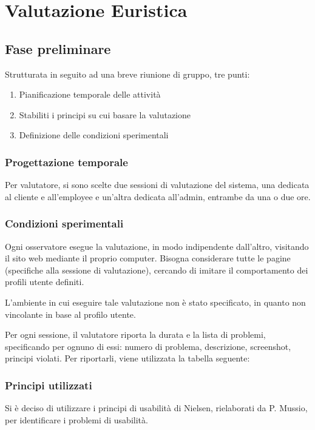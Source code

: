 \section{Valutazione Euristica}

\subsection{Fase preliminare}
Strutturata in seguito ad una breve riunione di gruppo, tre punti:
\begin{enumerate}
	\item Pianificazione temporale delle attività
	\item Stabiliti i principi su cui basare la valutazione
	\item Definizione delle condizioni sperimentali
\end{enumerate}
\subsubsection{Progettazione temporale}
Per valutatore, si sono scelte due sessioni di valutazione del sistema, una dedicata al cliente e all'employee e un'altra dedicata all'admin, entrambe da una o due ore.

\subsubsection{Condizioni sperimentali}
Ogni osservatore esegue la valutazione, in modo indipendente dall'altro, visitando il sito web mediante il proprio computer. Bisogna considerare tutte le pagine (specifiche alla sessione di valutazione), cercando di imitare il comportamento dei profili utente definiti.

L'ambiente in cui eseguire tale valutazione non è stato specificato, in quanto non vincolante in base al profilo utente.

Per ogni sessione, il valutatore riporta la durata e la lista di problemi, specificando per ognuno di essi: numero di problema, descrizione, screenshot, principi violati. Per riportarli, viene utilizzata la tabella seguente:
\\

\subsubsection{Principi utilizzati}
Si è deciso di utilizzare i principi di usabilità di Nielsen, rielaborati da P. Mussio, per identificare i problemi di usabilità. 

